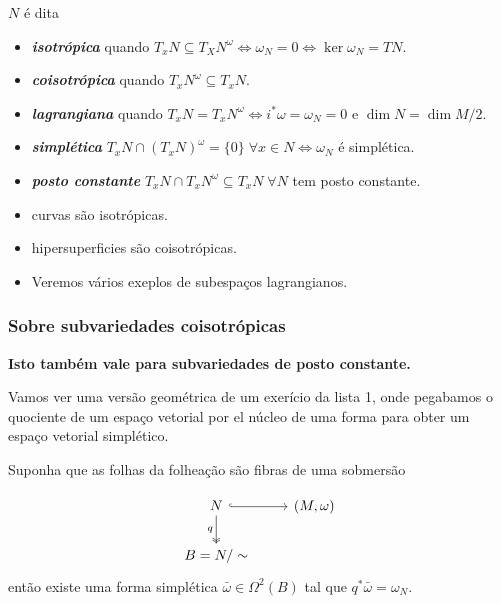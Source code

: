 \begin{defn}
	$N$ \'e dita
	\begin{itemize}
		\item \textit{\textbf{isotr\'opica}} quando $T_x N\subseteq T_X N^\omega\iff \omega_N=0\iff \ker \omega_N=T N$.

		\item \textit{\textbf{coisotr\'opica}} quando $T_x N^\omega\subseteq T_x N$.

		\item \textit{\textbf{lagrangiana}} quando $T_x N=T_x N^\omega\iff i^*\omega=\omega_N=0$ e $\dim N=\dim M/2$.

		\item \textit{\textbf{simpl\'etica}} $T_x N\cap(T_x N)^\omega=\{0\}\;\forall x\in N\iff \omega_N$ \'e simpl\'etica.

		\item \textit{\textbf{posto constante}} $T_x N\cap T_x N^\omega\subseteq T_x N\;\forall N$ tem posto constante.
	\end{itemize}
\end{defn}

\begin{example}\leavevmode 
	\begin{itemize}
		\item curvas s\~ao isotr\'opicas.
		\item hipersuperficies s\~ao coisotr\'opicas.
		\item Veremos v\'arios exeplos de subespaços lagrangianos.
	\end{itemize}
\end{example}

\subsubsection{Sobre subvariedades coisotr\'opicas}

\textbf{Isto tamb\'em vale para subvariedades de posto constante.} 

Vamos ver uma vers\~ao geom\'etrica de um exer\'icio da lista 1, onde pegabamos o quociente de um espaço vetorial por el n\'ucleo de uma forma para obter um espaço vetorial simpl\'etico.

\begin{exercise}
	Suponha que as folhas da folhea\c c\~ao s\~ao fibras de uma sobmers\~ao

	\[\begin{tikzcd}
		N\arrow[r,hook]\arrow[d,two heads,swap,"q"]&(M,\omega)\\
		B=N/\sim
	\end{tikzcd}\]
	ent\~ao existe uma forma simpl\'etica $\bar{\omega} \in\Omega^2(B)$ tal que $q^*\bar{\omega} =\omega_N$.
\end{exercise}

